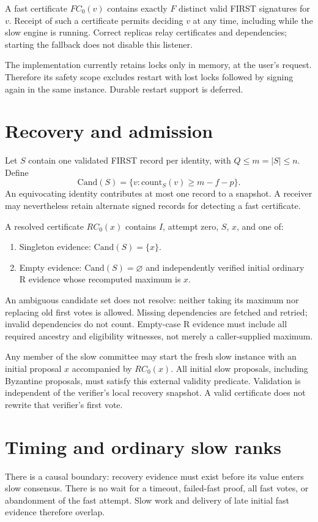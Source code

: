 \documentclass[11pt]{article}
\begin{document}
A fast certificate $FC_0(v)$ contains exactly $F$ distinct valid FIRST signatures
for $v$. Receipt of such a certificate permits deciding $v$ at any time,
including while the slow engine is running. Correct replicas relay certificates
and dependencies; starting the fallback does not disable this listener.

The implementation currently retains locks only in memory, at the user's
request. Therefore its safety scope excludes restart with lost locks followed
by signing again in the same instance. Durable restart support is deferred.

\section{Recovery and admission}
Let $S$ contain one validated FIRST record per identity, with $Q\leq m=|S|\leq n$.
Define
\[
 \mathrm{Cand}(S)=\{v:\mathrm{count}_S(v)\geq m-f-p\}.
\]
An equivocating identity contributes at most one record to a snapshot. A receiver
may nevertheless retain alternate signed records for detecting a fast certificate.

A resolved certificate $RC_0(x)$ contains $I$, attempt zero, $S$, $x$, and one of:
\begin{enumerate}
\item Singleton evidence: $\mathrm{Cand}(S)=\{x\}$.
\item Empty evidence: $\mathrm{Cand}(S)=\varnothing$ and independently verified
initial ordinary R evidence whose recomputed maximum is $x$.
\end{enumerate}
An ambiguous candidate set does not resolve: neither taking its maximum nor
replacing old first votes is allowed. Missing dependencies are fetched and retried;
invalid dependencies do not count. Empty-case R evidence must include all required
ancestry and eligibility witnesses, not merely a caller-supplied maximum.

Any member of the slow committee may start the fresh slow instance with an
initial proposal $x$ accompanied by $RC_0(x)$. All initial slow proposals,
including Byzantine proposals, must satisfy this external validity predicate.
Validation is independent of the verifier's local recovery snapshot. A valid
certificate does not rewrite that verifier's first vote.

\section{Timing and ordinary slow ranks}
There is a causal boundary: recovery evidence must exist before its value enters
slow consensus. There is no wait for a timeout, failed-fast proof, all fast votes,
or abandonment of the fast attempt. Slow work and delivery of late initial fast
evidence therefore overlap.
\end{document}
